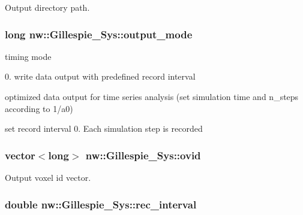 Output directory path. 

\hypertarget{classnw_1_1_gillespie___sys_aa5b4943f29fb0276596ace75e384565e}{
\subsubsection[{output\+\_\+mode}]{\setlength{\rightskip}{0pt plus 5cm}long nw\+::\+Gillespie\+\_\+\+Sys\+::output\+\_\+mode\hspace{0.3cm}{\ttfamily [private]}}}\label{classnw_1_1_gillespie___sys_aa5b4943f29fb0276596ace75e384565e}


timing mode 

0. write data output with predefined record interval
\begin{DoxyEnumerate}
\item optimized data output for time series analysis (set simulation time and n\+\_\+steps according to 1/a0)
\item set record interval 0. Each simulation step is recorded 
\end{DoxyEnumerate}\hypertarget{classnw_1_1_gillespie___sys_a136eaaf0a00fc739e797f3b2bea22386}{
\subsubsection[{ovid}]{\setlength{\rightskip}{0pt plus 5cm}vector$<$long$>$ nw\+::\+Gillespie\+\_\+\+Sys\+::ovid\hspace{0.3cm}{\ttfamily [private]}}}\label{classnw_1_1_gillespie___sys_a136eaaf0a00fc739e797f3b2bea22386}


Output voxel id vector. 

\hypertarget{classnw_1_1_gillespie___sys_a0de156c39c87a334da7477cb2a9c02cf}{
\subsubsection[{rec\+\_\+interval}]{\setlength{\rightskip}{0pt plus 5cm}double nw\+::\+Gillespie\+\_\+\+Sys\+::rec\+\_\+interval\hspace{0.3cm}{\ttfamily [private]}}}\label{classnw_1_1_gillespie___sys_a0de156c39c87a334da7477cb2a9c02cf}


